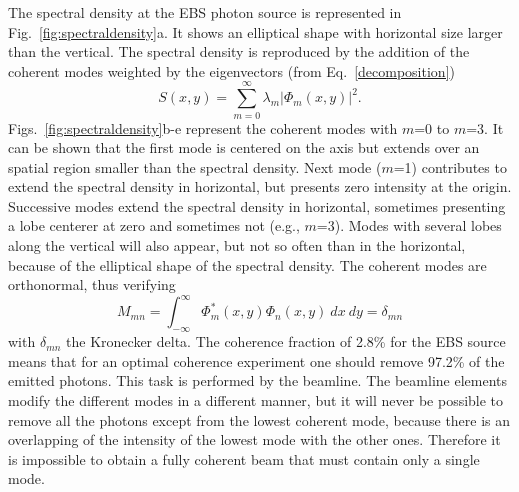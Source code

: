 \documentclass{iucr}              %
\begin{document}
The spectral density at the EBS photon source is represented in Fig.~\ref{fig:spectraldensity}a. It shows an elliptical shape with horizontal size larger than the vertical.  The spectral density is reproduced by the addition of the coherent modes weighted by the eigenvectors (from Eq.~\ref{decomposition})
\begin{equation}
S(x,y) = \sum_{m=0}^{\infty} \lambda_m |\Phi_m(x,y)|^2.
\end{equation}
Figs.~\ref{fig:spectraldensity}b-e represent the coherent modes with $m$=0 to $m$=3. It can be shown that the first mode is centered on the axis but extends over an spatial region smaller than the spectral density. Next mode ($m$=1) contributes to extend the spectral density in horizontal, but presents zero intensity at the origin. Successive modes extend  the spectral density in horizontal, sometimes presenting a lobe centerer at zero and sometimes not (e.g., $m$=3). Modes with several lobes along the vertical will also appear, but not so often than in the horizontal, because of the elliptical shape of the spectral density. The coherent modes are orthonormal, thus verifying 
\begin{equation}\label{eq:mode normalization}
M_{mn} = \int_{-\infty}^{\infty} \Phi^*_m(x,y) \Phi_n(x,y)~dx~dy = \delta_{mn}
\end{equation}
with $\delta_{mn}$ the Kronecker delta. The coherence fraction of 2.8\% for the EBS source means that for an optimal coherence experiment one should remove 97.2\% of the emitted photons. This task is performed by the beamline. The beamline elements modify the different modes in a different manner, but it will never be possible to remove all the photons except from the lowest coherent mode, because there is an overlapping of the intensity of the lowest mode with the other ones. Therefore it is impossible to obtain a fully coherent beam that must contain only a single mode. 

   
\end{document}
